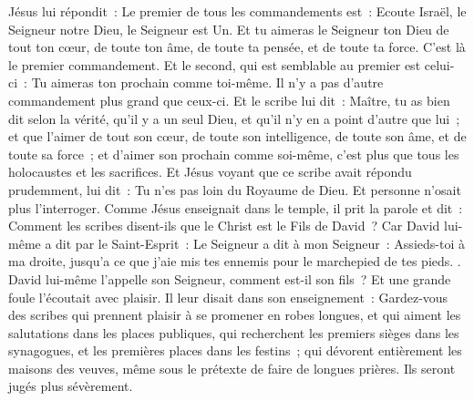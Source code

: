 \begin{multicols}{2}
Jésus lui répondit~: Le premier de tous les commandements est~: Ecoute Israël, le Seigneur notre Dieu, le Seigneur est Un.
Et tu aimeras le Seigneur ton Dieu de tout ton cœur, de toute ton âme, de toute ta pensée, et de toute ta force. C'est là le premier commandement.
Et le second, qui est semblable au premier est celui-ci~: Tu aimeras ton prochain comme toi-même. Il n'y a pas d'autre commandement plus grand que ceux-ci.
Et le scribe lui dit~: Maître, tu as bien dit selon la vérité, qu'il y a un seul Dieu, et qu'il n'y en a point d'autre que lui~;
et que l'aimer de tout son cœur, de toute son intelligence, de toute son âme, et de toute sa force~; et d'aimer son prochain comme soi-même, c'est plus que tous les holocaustes et les sacrifices.
Et Jésus voyant que ce scribe avait répondu prudemment, lui dit~: Tu n'es pas loin du Royaume de Dieu. Et personne n'osait plus l'interroger.
Comme Jésus enseignait dans le temple, il prit la parole et dit~: Comment les scribes disent-ils que le Christ est le Fils de David~?
Car David lui-même a dit par le Saint-Esprit~: Le Seigneur a dit à mon Seigneur~: Assieds-toi à ma droite, jusqu'a ce que j'aie mis tes ennemis pour le marchepied de tes pieds.
.
David lui-même l'appelle son Seigneur, comment est-il son fils~? Et une grande foule l'écoutait avec plaisir.
Il leur disait dans son enseignement~: Gardez-vous des scribes qui prennent plaisir à se promener en robes longues, et qui aiment les salutations dans les places publiques,
qui recherchent les premiers sièges dans les synagogues, et les premières places dans les festins~;
qui dévorent entièrement les maisons des veuves, même sous le prétexte de faire de longues prières. Ils seront jugés plus sévèrement.

\end{multicols}
